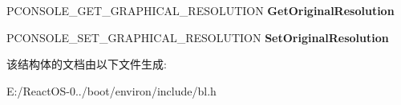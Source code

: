\begin{DoxyCompactItemize}
\item 
\mbox{\label{struct___b_l___g_r_a_p_h_i_c_s___c_o_n_s_o_l_e___v_t_a_b_l_e_a7093545dd4b2c66058b24d18a72437e9}} 
P\+C\+O\+N\+S\+O\+L\+E\+\_\+\+G\+E\+T\+\_\+\+G\+R\+A\+P\+H\+I\+C\+A\+L\+\_\+\+R\+E\+S\+O\+L\+U\+T\+I\+ON {\bfseries Get\+Original\+Resolution}
\item 
\mbox{\label{struct___b_l___g_r_a_p_h_i_c_s___c_o_n_s_o_l_e___v_t_a_b_l_e_aafdcd83c465e193c82ab06b8fe80c416}} 
P\+C\+O\+N\+S\+O\+L\+E\+\_\+\+S\+E\+T\+\_\+\+G\+R\+A\+P\+H\+I\+C\+A\+L\+\_\+\+R\+E\+S\+O\+L\+U\+T\+I\+ON {\bfseries Set\+Original\+Resolution}
\end{DoxyCompactItemize}


该结构体的文档由以下文件生成\+:\begin{DoxyCompactItemize}
\item 
E\+:/\+React\+O\+S-\/0../boot/environ/include/bl.\+h\end{DoxyCompactItemize}
